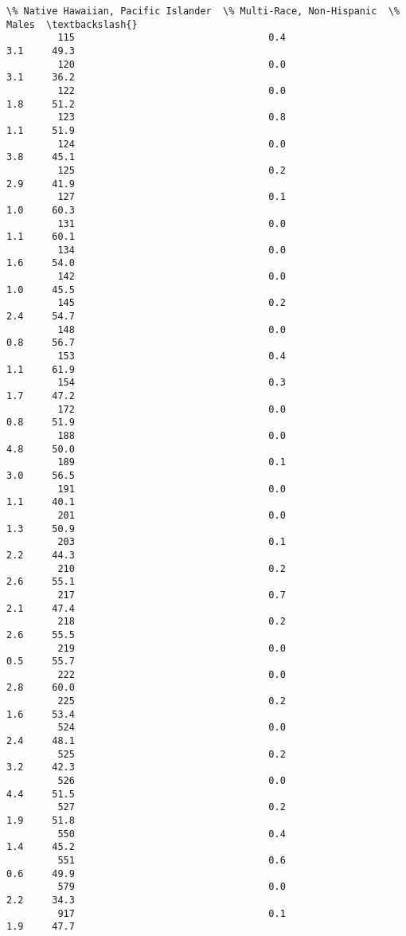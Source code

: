 \documentclass[11pt]{article}
\begin{document}
\begin{Verbatim}[commandchars=\\\{\}]
              \% Native Hawaiian, Pacific Islander  \% Multi-Race, Non-Hispanic  \% Males  \textbackslash{}
         115                                  0.4                         3.1     49.3   
         120                                  0.0                         3.1     36.2   
         122                                  0.0                         1.8     51.2   
         123                                  0.8                         1.1     51.9   
         124                                  0.0                         3.8     45.1   
         125                                  0.2                         2.9     41.9   
         127                                  0.1                         1.0     60.3   
         131                                  0.0                         1.1     60.1   
         134                                  0.0                         1.6     54.0   
         142                                  0.0                         1.0     45.5   
         145                                  0.2                         2.4     54.7   
         148                                  0.0                         0.8     56.7   
         153                                  0.4                         1.1     61.9   
         154                                  0.3                         1.7     47.2   
         172                                  0.0                         0.8     51.9   
         188                                  0.0                         4.8     50.0   
         189                                  0.1                         3.0     56.5   
         191                                  0.0                         1.1     40.1   
         201                                  0.0                         1.3     50.9   
         203                                  0.1                         2.2     44.3   
         210                                  0.2                         2.6     55.1   
         217                                  0.7                         2.1     47.4   
         218                                  0.2                         2.6     55.5   
         219                                  0.0                         0.5     55.7   
         222                                  0.0                         2.8     60.0   
         225                                  0.2                         1.6     53.4   
         524                                  0.0                         2.4     48.1   
         525                                  0.2                         3.2     42.3   
         526                                  0.0                         4.4     51.5   
         527                                  0.2                         1.9     51.8   
         550                                  0.4                         1.4     45.2   
         551                                  0.6                         0.6     49.9   
         579                                  0.0                         2.2     34.3   
         917                                  0.1                         1.9     47.7   
         

\end{Verbatim}
\end{document}
